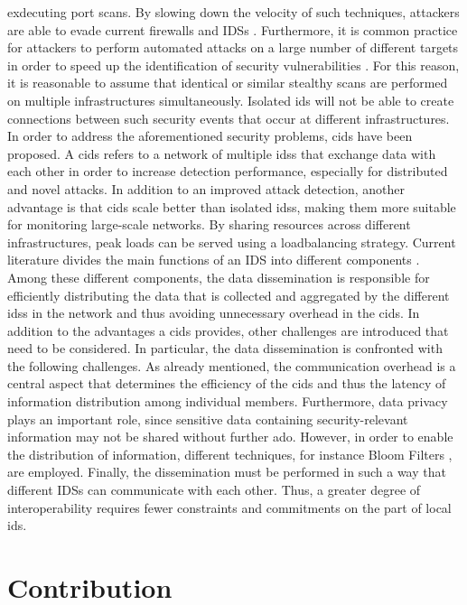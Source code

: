 \documentclass[../../main.tex]{subfiles}
\begin{document}
exdecuting port scans. By slowing down the velocity of such techniques, attackers are able to evade current firewalls and IDSs \cite{riquet2012large}. Furthermore, it is common practice for attackers to perform automated attacks on a large number of different targets in order to speed up the identification of security vulnerabilities \cite{savage2005}. For this reason, it is reasonable to assume that identical or similar stealthy scans are performed on multiple infrastructures simultaneously. Isolated \gls{ids} will not be able to create connections between such security events that occur at different infrastructures. In order to address the aforementioned security problems, \gls{cids} have been proposed. A \gls{cids} refers to a network of multiple \glspl{ids} that exchange data with each other in order to increase detection performance, especially for distributed and novel attacks. In addition to an improved attack detection, another advantage is that \gls{cids} scale better than isolated \glspl{ids}, making them more suitable for monitoring large-scale networks. By sharing resources across different infrastructures, peak loads can be served using a loadbalancing strategy. Current literature divides the main functions of an IDS into different components \cite{vasilomanolakis_collaborative_2016}. Among these different components, the data dissemination is responsible for efficiently distributing the data that is collected and aggregated by the different \glspl{ids} in the network and thus avoiding unnecessary overhead in the \gls{cids}. In addition to the advantages a \gls{cids} provides, other challenges are introduced that need to be considered. In particular, the data dissemination is confronted with the following challenges. As already mentioned, the communication overhead is a central aspect that determines the efficiency of the \gls{cids} and thus the latency of information distribution among individual members. Furthermore, data privacy plays an important role, since sensitive data containing security-relevant information may not be shared without further ado. However, in order to enable the distribution of information, different techniques, for instance Bloom Filters \cite{Vasilomanolakis2015SkipMon} \cite{Locasto2005}, are employed. Finally, the dissemination must be performed in such a way that different IDSs can communicate with each other. Thus, a greater degree of interoperability requires fewer constraints and commitments on the part of local \gls{ids}.

\section{Contribution}\label{sec:contribution}
\end{document}

